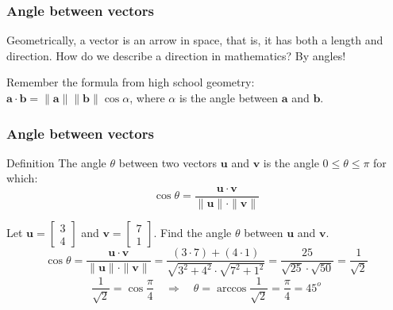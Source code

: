 \documentclass{beamer}
\newcommand{\va}{\mathbf{a}}
\newcommand{\vb}{\mathbf{b}}
\begin{document}

\begin{frame}
  \frametitle{Angle between vectors}
Geometrically, a vector is an arrow in space, that is, it has both a length and direction. \pause How do we describe a direction in mathematics? \pause By angles!
\bigskip

  \begin{center}
      
  \end{center}

  \pause \bigskip  Remember the formula from high school geometry: \\$\va \cdot \vb = \|\va\| \|\vb\| \cos\alpha$, where $\alpha$ is the angle between $\va$ and $\vb$.

\end{frame}


\begin{frame}
  \frametitle{Angle between vectors}
\begin{block}{Definition}
    The angle $\theta$ between two vectors $\mathbf{u}$ and $\mathbf{v}$ is the angle $0 \le \theta \le \pi$ for which:
    \[ \cos \theta = \frac{\mathbf{u} \cdot \mathbf{v}}{\|\mathbf{u}\| \cdot \|\mathbf{v}\|} \]
  \end{block}
  \pause

  \begin{example}
    Let $\mathbf{u} = \begin{bmatrix} 3 \\ 4 \end{bmatrix}$ and $\mathbf{v} = \begin{bmatrix} 7\\ 1 \end{bmatrix}$. Find the angle $\theta$ between $\mathbf{u}$ and $\mathbf{v}$.
    \[ \cos \theta = \frac{\mathbf{u} \cdot \mathbf{v}}{\|\mathbf{u}\| \cdot \|\mathbf{v}\|}  = \frac{(3 \cdot 7) + (4 \cdot 1)}{\sqrt{3^2 + 4^2} \cdot \sqrt{7^2 + 1^2}} = \frac{25}{\sqrt{25} \cdot \sqrt{50}} =\frac{1}{\sqrt{2}}\]
    \[ \frac{1}{\sqrt{2}}=\cos{\frac{\pi}{4}} \quad \Rightarrow \quad \theta = \arccos \frac{1}{\sqrt{2}} = \frac{\pi}{4}=45^o \]
  \end{example}

\end{frame}
\end{document}
